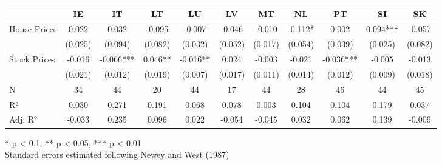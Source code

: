 \begin{table}[h]
\fontsize{7.5pt}{9.0pt}\selectfont
\begin{tabular*}{\linewidth}{@{\extracolsep{\fill}}lcccccccccc}
\toprule
  & IE & IT & LT & LU & LV & MT & NL & PT & SI & SK \\ 
\midrule\addlinespace[2.5pt]
House Prices & 0.022 & 0.032 & -0.095 & -0.007 & -0.046 & -0.010 & -0.112* & 0.002 & 0.094*** & -0.057 \\ 
 & (0.025) & (0.094) & (0.082) & (0.032) & (0.052) & (0.017) & (0.054) & (0.039) & (0.025) & (0.082) \\ 
Stock Prices & -0.016 & -0.066*** & 0.046** & -0.016** & 0.024 & -0.003 & -0.021 & -0.036*** & -0.005 & -0.013 \\ 
{} & {(0.021)} & {(0.012)} & {(0.019)} & {(0.007)} & {(0.017)} & {(0.011)} & {(0.014)} & {(0.012)} & {(0.009)} & {(0.018)} \\ 
N & 34 & 44 & 20 & 44 & 17 & 44 & 28 & 46 & 44 & 45 \\ 
R² & 0.030 & 0.271 & 0.191 & 0.068 & 0.078 & 0.003 & 0.104 & 0.104 & 0.179 & 0.037 \\ 
Adj. R² & -0.033 & 0.235 & 0.096 & 0.022 & -0.054 & -0.045 & 0.032 & 0.062 & 0.139 & -0.009 \\ 
\bottomrule
\end{tabular*}
\begin{minipage}{\linewidth}
* p < 0.1, ** p < 0.05, *** p < 0.01\\
Standard errors estimated following Newey and West (1987)\\
\end{minipage}
\end{table}

